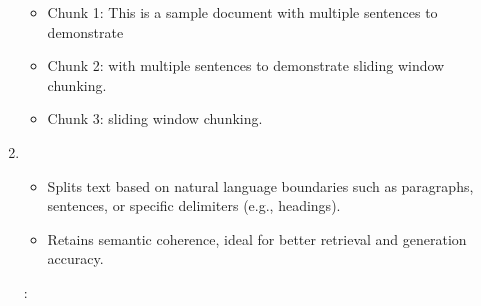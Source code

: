 \documentclass[letterpaper,11pt,english]{sphinxmanual}
\begin{document}
\begin{enumerate}
\begin{sphinxVerbatim}[commandchars=\\\{\}]
  
    
    
\end{sphinxVerbatim}
\begin{description}
\begin{itemize}
\item {} 
\sphinxAtStartPar
Chunk 1: This is a sample document with multiple sentences to demonstrate

\item {} 
\sphinxAtStartPar
Chunk 2: with multiple sentences to demonstrate sliding window chunking.

\item {} 
\sphinxAtStartPar
Chunk 3: sliding window chunking.

\end{itemize}

\end{description}

\item {} 
\sphinxAtStartPar
{}
\begin{itemize}
\item {} 
\sphinxAtStartPar
Splits text based on natural language boundaries such as paragraphs, sentences, or specific delimiters (e.g., headings).

\item {} 
\sphinxAtStartPar
Retains semantic coherence, ideal for better retrieval and generation accuracy.

\end{itemize}

\sphinxAtStartPar
{}:

\begin{sphinxVerbatim}[commandchars=\\\{\}]
 


\end{sphinxVerbatim}
\end{enumerate}
\end{document}
